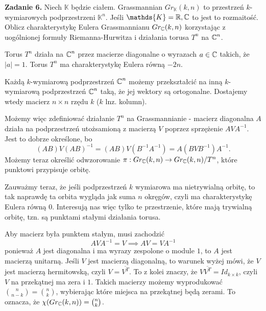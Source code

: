 \textbf{\large\color{orange}Zadanie 6.} Niech $\mathds{K}$ będzie ciałem. Grassmannian $Gr_{\mathds{K}}(k,n)$ to przestrzeń $k$-wymiarowych podprzestrzeni $\mathds{K}^n$. Jeśli $\mathds{K}=\R,\C$ to jest to rozmaitość. Oblicz charakterystykę Eulera Grassmannianu $Gr_{\operatorname{\mathbb{C}}}(k,n)$ korzystając z uogólnionej formuły Riemanna-Hurwitza i działania torusa $T^n$ na $\operatorname{\mathbb{C}}^n$.

\dotfill 

Torus $T^n$ działa na $\operatorname{\mathbb{C}}^n$ przez macierze diagonalne o wyrazach $a\in\operatorname{\mathbb{C}}$ takich, że $|a|=1$.
Torus $T^n$ ma charakterystykę Eulera równą $-2n$.

Każdą $k$-wymiarową podprzestrzeń $\operatorname{\mathbb{C}}^n$ możemy przekształcić na inną $k$-wymiarową podprzestrzeń $\operatorname{\mathbb{C}}^n$ taką, że jej wektory są ortogonalne. Dostajemy wtedy macierz $n\times n$ rzędu $k$ ($k$ lnz. kolumn).

Możemy więc zdefiniować działanie $T^n$ na Grassmannianie - macierz diagonalna $A$ działa na podprzestrzeń utożsamioną z macierzą $V$ poprzez sprzężenie $AVA^{-1}$. Jest to dobrze określone, bo 
$$(AB)V(AB)^{-1}=(AB)V(B^{-1}A^{-1})=A(BVB^{-1})A^{-1}.$$
Możemy teraz określić odwzorowanie $\pi:Gr_{\operatorname{\mathbb{C}}}(k,n)\to Gr_{\operatorname{\mathbb{C}}}(k,n)/T^n$, które punktowi przypisuje orbitę. 

Zauważmy teraz, że jeśli podprzestrzeń $k$ wymiarowa ma nietrywialną orbitę, to tak naprawdę ta orbita wygląda jak suma $n$ okręgów, czyli ma charakterystykę Eulera równą $0$. Interesują nas więc tylko te przestrzenie, które mają trywialną orbitę, tzn. są punktami stałymi działania torusa.

Aby macierz była punktem stałym, musi zachodzić
$$AVA^{-1}=V\implies AV=VA^{-1}$$
ponieważ $A$ jest diagonalna i ma wyrazy zespolone o module $1$, to $A$ jest macierzą unitarną. Jeśli $V$ jest macierzą diagonalną, to warunek wyżej mówi, że $V$ jest macierzą hermitowską, czyli $V=\overline{V^T}$. To z kolei znaczy, że $V\overline{V^T}=Id_{k\times k}$, czyli $V$ na przekątnej ma zera i $1$. Takich macierzy możemy wyprodukować $\binom{n}{n-k}=\binom{n}{k}$, wybierając które miejsca na przekątnej będą zerami. To oznacza, że $\chi(Gr_{\operatorname{\mathbb{C}}}(k,n))=\binom{n}{k}$. 
